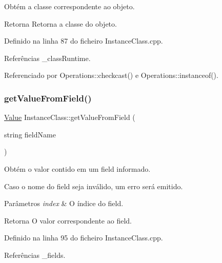 Obtém a classe correspondente ao objeto. 

\begin{DoxyReturn}{Retorna}
Retorna a classe do objeto. 
\end{DoxyReturn}


Definido na linha 87 do ficheiro Instance\+Class.\+cpp.



Referências \+\_\+class\+Runtime.



Referenciado por Operations\+::checkcast() e Operations\+::instanceof().

\mbox{\label{classInstanceClass_aee974c71919d470ea2e9aa75cf741a39}} 
\subsubsection{\texorpdfstring{get\+Value\+From\+Field()}{getValueFromField()}}
{\footnotesize\ttfamily \hyperlink{structValue}{Value} Instance\+Class\+::get\+Value\+From\+Field (\begin{DoxyParamCaption}\item[{string}]{field\+Name }\end{DoxyParamCaption})}



Obtém o valor contido em um field informado. 

Caso o nome do field seja inválido, um erro será emitido. 
\begin{DoxyParams}{Parâmetros}
{\em index} & O índice do field. \\
\hline
\end{DoxyParams}
\begin{DoxyReturn}{Retorna}
O valor correspondente ao field. 
\end{DoxyReturn}


Definido na linha 95 do ficheiro Instance\+Class.\+cpp.



Referências \+\_\+fields.

\mbox{\label{classInstanceClass_ae8570307f49cb95cc01fb8d6bda23763}} 
